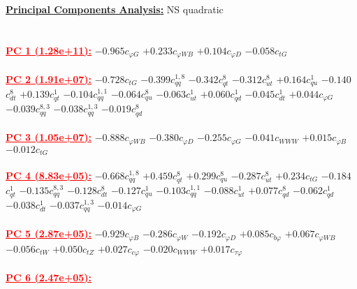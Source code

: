 \documentclass{article}
\begin{document}
\noindent \underline{\bf{Principal Components Analysis}:} NS quadratic\\ \\ \\
\noindent \textcolor{red}{\underline{\bf{PC 1} (1.28e+11):}}
{$-0.965$}{\rm $c_{\varphi G}$}
{$+0.233$}{\rm $c_{\varphi WB}$}
{$+0.104$}{\rm $c_{\varphi D}$}
{$-0.058$}{\rm $c_{tG}$}
 \nonumber \\ \nonumber \\
\noindent \textcolor{red}{\underline{\bf{PC 2} (1.91e+07):}}
{$-0.728$}{\rm $c_{tG}$}
{$-0.399$}{\rm $c_{qq}^{1,8}$}
{$-0.342$}{\rm $c_{qt}^{8}$}
{$-0.312$}{\rm $c_{ut}^{8}$}
{$+0.164$}{\rm $c_{qu}^{1}$}
{$-0.140$}{\rm $c_{dt}^{8}$}
{$+0.139$}{\rm $c_{qt}^{1}$}
{$-0.104$}{\rm $c_{qq}^{1,1}$}
{$-0.064$}{\rm $c_{qu}^{8}$}
{$-0.063$}{\rm $c_{ut}^{1}$}
{$+0.060$}{\rm $c_{qd}^{1}$}
{$-0.045$}{\rm $c_{dt}^{1}$}
{$+0.044$}{\rm $c_{\varphi G}$}
{$-0.039$}{\rm $c_{qq}^{8,3}$}
{$-0.038$}{\rm $c_{qq}^{1,3}$}
{$-0.019$}{\rm $c_{qd}^{8}$}
 \nonumber \\ \nonumber \\
\noindent \textcolor{red}{\underline{\bf{PC 3} (1.05e+07):}}
{$-0.888$}{\rm $c_{\varphi WB}$}
{$-0.380$}{\rm $c_{\varphi D}$}
{$-0.255$}{\rm $c_{\varphi G}$}
{$-0.041$}{\rm $c_{WWW}$}
{$+0.015$}{\rm $c_{\varphi B}$}
{$-0.012$}{\rm $c_{tG}$}
 \nonumber \\ \nonumber \\
\noindent \textcolor{red}{\underline{\bf{PC 4} (8.83e+05):}}
{$-0.668$}{\rm $c_{qq}^{1,8}$}
{$+0.459$}{\rm $c_{qt}^{8}$}
{$+0.299$}{\rm $c_{qu}^{8}$}
{$-0.287$}{\rm $c_{ut}^{8}$}
{$+0.234$}{\rm $c_{tG}$}
{$-0.184$}{\rm $c_{qt}^{1}$}
{$-0.135$}{\rm $c_{qq}^{8,3}$}
{$-0.128$}{\rm $c_{dt}^{8}$}
{$-0.127$}{\rm $c_{qu}^{1}$}
{$-0.103$}{\rm $c_{qq}^{1,1}$}
{$-0.088$}{\rm $c_{ut}^{1}$}
{$+0.077$}{\rm $c_{qd}^{8}$}
{$-0.062$}{\rm $c_{qd}^{1}$}
{$-0.038$}{\rm $c_{dt}^{1}$}
{$-0.037$}{\rm $c_{qq}^{1,3}$}
{$-0.014$}{\rm $c_{\varphi G}$}
 \nonumber \\ \nonumber \\
\noindent \textcolor{red}{\underline{\bf{PC 5} (2.87e+05):}}
{$-0.929$}{\rm $c_{\varphi B}$}
{$-0.286$}{\rm $c_{\varphi W}$}
{$-0.192$}{\rm $c_{\varphi D}$}
{$+0.085$}{\rm $c_{b \varphi}$}
{$+0.067$}{\rm $c_{\varphi WB}$}
{$-0.056$}{\rm $c_{tW}$}
{$+0.050$}{\rm $c_{tZ}$}
{$+0.027$}{\rm $c_{c \varphi}$}
{$-0.020$}{\rm $c_{WWW}$}
{$+0.017$}{\rm $c_{\tau \varphi}$}
 \nonumber \\ \nonumber \\
\noindent \textcolor{red}{\underline{\bf{PC 6} (2.47e+05):}}
\end{document}
